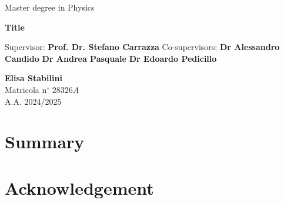\documentclass{book}
\theoremstyle{definition}
\begin{document}

\begin{center}
{\Large  Master degree in Physics }
\end{center}


\vskip1.5cm
\begin{center}
{\fontsize{15}{20}\selectfont \textbf{Title\\}}
\end{center}


{\large
\vskip 20mm Supervisor:
\vskip 0.2mm \large  \textbf{Prof. Dr. Stefano Carrazza}
\vskip 5mm
\large Co-supervisors:
\vskip 0.2mm
\large \textbf{Dr Alessandro Candido}
\large \textbf{Dr Andrea Pasquale}
\large \textbf{Dr Edoardo Pedicillo}
}


\vskip 2cm
\hskip 9cm\parbox[t]{7cm}
{\large 
\textbf{Elisa Stabilini}\\
Matricola n$^\circ$ $28326A$\\
A.A. $2024$/$2025$\\      
}
\clearpage


\clearpage
\tableofcontent
\clearpage

\chapter*{Summary}
%


\chapter*{Acknowledgement}
\end{document}

